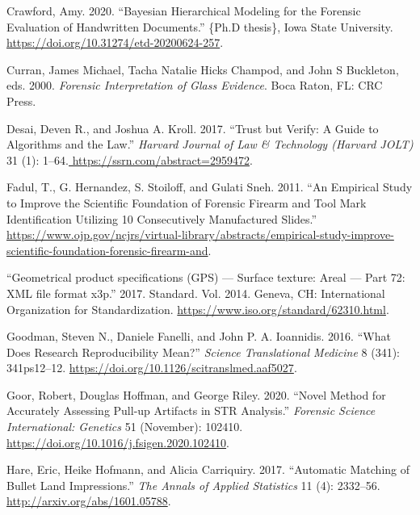 \begin{CSLReferences}{1}{0}
\leavevmode{}%
Crawford, Amy. 2020. {``Bayesian Hierarchical Modeling for the Forensic Evaluation of Handwritten Documents.''} \{Ph.D thesis\}, Iowa State University. \url{https://doi.org/10.31274/etd-20200624-257}.

\leavevmode{}%
Curran, James Michael, Tacha Natalie Hicks Champod, and John S Buckleton, eds. 2000. \emph{Forensic Interpretation of Glass Evidence}. Boca Raton, FL: CRC Press.

\leavevmode{}%
Desai, Deven R., and Joshua A. Kroll. 2017. {``Trust but {Verify}: {A} {Guide} to {Algorithms} and the {Law}.''} \emph{Harvard Journal of Law \& Technology (Harvard JOLT)} 31 (1): 1--64.\href{\%20https://ssrn.com/abstract=2959472}{ https://ssrn.com/abstract=2959472}.

\leavevmode{}%
Fadul, T., G. Hernandez, S. Stoiloff, and Gulati Sneh. 2011. {``An {Empirical} {Study} to {Improve} the {Scientific} {Foundation} of {Forensic} {Firearm} and {Tool} {Mark} {Identification} {Utilizing} 10 {Consecutively} {Manufactured} {Slides}.''} \url{https://www.ojp.gov/ncjrs/virtual-library/abstracts/empirical-study-improve-scientific-foundation-forensic-firearm-and}.

\leavevmode{}%
{``{Geometrical product specifications (GPS) --- Surface texture: Areal --- Part 72: XML file format x3p}.''} 2017. Standard. Vol. 2014. Geneva, CH: International Organization for Standardization. \url{https://www.iso.org/standard/62310.html}.

\leavevmode{}%
Goodman, Steven N., Daniele Fanelli, and John P. A. Ioannidis. 2016. {``What Does Research Reproducibility Mean?''} \emph{Science Translational Medicine} 8 (341): 341ps12--12. \url{https://doi.org/10.1126/scitranslmed.aaf5027}.

\leavevmode{}%
Goor, Robert, Douglas Hoffman, and George Riley. 2020. {``Novel Method for Accurately Assessing Pull-up Artifacts in STR Analysis.''} \emph{Forensic Science International: Genetics} 51 (November): 102410. \url{https://doi.org/10.1016/j.fsigen.2020.102410}.

\leavevmode{}%
Hare, Eric, Heike Hofmann, and Alicia Carriquiry. 2017. {``Automatic {Matching} of {Bullet} {Land} {Impressions}.''} \emph{The Annals of Applied Statistics} 11 (4): 2332--56. \url{http://arxiv.org/abs/1601.05788}.


\end{CSLReferences}
